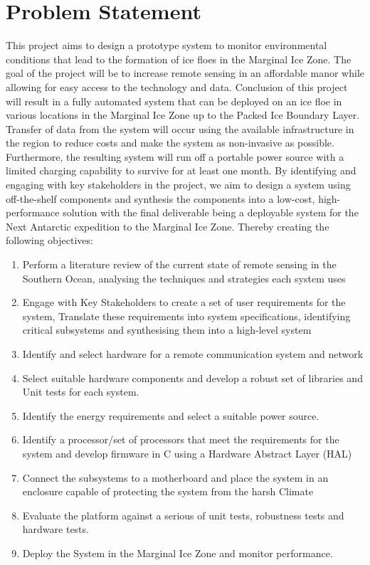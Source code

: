 \section{Problem Statement}
\label{subsec:ch1.section2}

This project aims to design a prototype system to monitor environmental conditions that lead to the formation of ice floes in the Marginal Ice Zone. The goal of the project will be to increase remote sensing in an affordable manor while allowing for easy access to the technology and data.  Conclusion of this project will result in a fully automated system that can be deployed on an ice floe in various locations in the Marginal Ice Zone up to the Packed Ice Boundary Layer. Transfer of data from the system will occur using the available infrastructure in the region to reduce costs and make the system as non-invasive as possible. Furthermore, the resulting system will run off a portable power source with a limited charging capability to survive for at least one month. By identifying and engaging with key stakeholders in the project, we aim to design a system using off-the-shelf components and synthesis the components into a low-cost, high-performance solution with the final deliverable being a deployable system for the Next Antarctic expedition to the Marginal Ice Zone.  Thereby creating the following objectives:
\begin{enumerate}
    \item Perform a literature review of the current state of remote sensing in the Southern Ocean, analysing the techniques and strategies each system uses
    \item Engage with Key Stakeholders to create a set of user requirements for the system, Translate these requirements into system specifications, identifying critical subsystems and synthesising them into a high-level system
    \item Identify and select hardware for a remote communication system and network
    \item Select suitable hardware components and develop a robust set of libraries and Unit tests for each system.
    \item Identify the energy requirements and select a suitable power source.
    \item Identify a processor/set of processors that meet the requirements for the system and develop firmware in C using a Hardware Abstract Layer (HAL)
    \item Connect the subsystems to a motherboard and place the system in an enclosure capable of protecting the system from the harsh Climate 
    \item Evaluate the platform against a serious of unit tests, robustness tests and  hardware tests.
    \item Deploy the System in the Marginal Ice Zone and monitor performance.
\end{enumerate}

